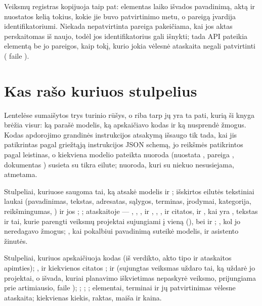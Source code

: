 Veiksmų registras kopijuoja taip pat:  elementas laiko išvados
pavadinimą, aktą ir nuostatos kelią tokius, kokie jie buvo patvirtinimo metu, o pareigą
įvardija identifikatoriumi. Niekada nepatvirtinta pareiga pakeičiama, kai jos aktas
perskaitomas iš naujo, todėl jos identifikatorius gali išnykti; tada API pateikia elementą be
jo pareigos, kaip tokį, kurio jokia vėlesnė ataskaita negali patvirtinti (
faile ).

\section{Kas rašo kuriuos stulpelius}\label{sec:data:writers}

Lentelėse sumaišytos trys turinio rūšys, o riba tarp jų yra ta pati, kurią ši knyga brėžia
visur: ką parašė modelis, ką apskaičiavo kodas ir ką nusprendė žmogus. Kodas apdorojimo
grandinės instrukcijos atsakymą išsaugo tik tada, kai jis patikrintas pagal griežtąją
instrukcijos JSON schemą, jo reikšmės patikrintos pagal leistinas, o kiekviena modelio
pateikta nuoroda (nuostata , pareiga , dokumentas ) susieta su tikra
eilute; nuoroda, kuri su niekuo nesusiejama, atmetama.

\begin{aibox}{Stulpeliai, kuriuose saugoma tai, ką atsakė modelis}
 ir ; išskirtos 
eilutės tekstiniai laukai (pavadinimas, tekstas, adresatas, sąlygos, terminas, įrodymai,
kategorija, reikšmingumas, ) ir jos ;
; ataskaitoje --- ,
, ,  ir ,
, ,  ir 
citatos,  ir , kai  yra
,  tekstas ir tai, kurie parengti veiksmų projektai
sujungiami į vieną (), bei  ir ;
, kol jo neredagavo žmogus; , kai
pokalbiui pavadinimą suteikė modelis, ir asistento žinutės.
\end{aibox}

\begin{codebox}{Stulpeliai, kuriuos apskaičiuoja kodas}
 (iš verdikto, akto tipo ir ataskaitos apimties);
,  ir kiekvienos citatos ;
 ir  (sujungtas veiksmas uždaro tai, ką
uždarė jo projektai, o išvada, kuriai planavimo iškvietimas nepaskyrė veiksmo, prijungiama
prie artimiausio,  faile );
; ; ;
 elementai, terminai ir jų patvirtinimas vėlesne ataskaita; kiekvienas
kiekis, raktas, maiša ir kaina.
\end{codebox}

